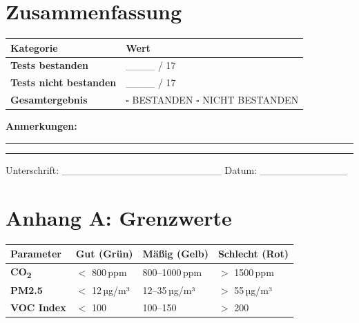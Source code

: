 \documentclass[a4paper,11pt]{article}
\begin{document}
\section{Zusammenfassung}

\begin{longtable}{p{6cm} p{7cm}}
\toprule
\rowcolor{tableheader}
\textbf{Kategorie} & \textbf{Wert} \\
\midrule
\endhead
\textbf{Tests bestanden}       & \_\_\_\_ / 17 \\
\textbf{Tests nicht bestanden} & \_\_\_\_ / 17 \\
\textbf{Gesamtergebnis}        & $\square$ BESTANDEN \quad $\square$ NICHT BESTANDEN \\
\bottomrule
\end{longtable}

\vspace{1cm}
\textbf{Anmerkungen:}

\rule{\textwidth}{0.4pt}

\vspace{0.5cm}
\rule{\textwidth}{0.4pt}

\vspace{1cm}
Unterschrift: \_\_\_\_\_\_\_\_\_\_\_\_\_\_\_\_\_\_\_\_\_\_ \hfill Datum: \_\_\_\_\_\_\_\_\_\_\_\_

\appendix
\section{Anhang A: Grenzwerte}

\begin{longtable}{p{3cm} p{3.5cm} p{3.5cm} p{3.5cm}}
\toprule
\rowcolor{tableheader}
\textbf{Parameter} & \textbf{Gut (Grün)} & \textbf{Mäßig (Gelb)} & \textbf{Schlecht (Rot)} \\
\midrule
\endhead
\textbf{CO\textsubscript{2}} & $<$ 800\,ppm & 800--1000\,ppm & $>$ 1500\,ppm \\
\textbf{PM2.5}                & $<$ 12\,µg/m³ & 12--35\,µg/m³ & $>$ 55\,µg/m³ \\
\textbf{VOC Index}            & $<$ 100 & 100--150 & $>$ 200 \\
\bottomrule
\end{longtable}

\end{document}
